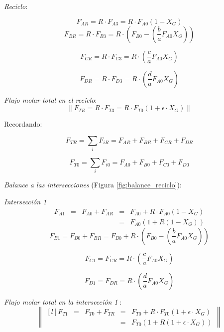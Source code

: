     \textit{Reciclo}:
    
    \begin{equation}
    \label{eq:flujo_en_reciclo_a}
        F_{AR} = R \cdot F_{A3} = R \cdot F_{A0} \left ( 1 - X_{G} \right )
    \end{equation}
    \[F_{BR} = R \cdot F_{B3} = R \cdot \left ( F_{B0} - \left (\frac{b}{a} F_{A0} X_{G} \right ) \right )\]
    
    \begin{multicols}{2}
        \[F_{CR} = R \cdot F_{C3} = R \cdot \left (\frac{c}{a} F_{A0}X_{G} \right )\]
        
        \[F_{DR} = R \cdot F_{D3} = R \cdot \left (\frac{d}{a} F_{A0}X_{G} \right )\]
    \end{multicols}
    
    \textit{Flujo molar total en el reciclo}:
    \[\left \| F_{TR} = R \cdot F_{T3} = R \cdot F_{T0} \left ( 1 + \epsilon \cdot X_{G} \right ) \right \|\]
    
    Recordando:
    \begin{multicols}{2}
        \[F_{TR} = \sum_{i} F_{iR} = F_{AR} + F_{BR} + F_{CR} + F_{DR}\]
        
        \[F_{T0} = \sum_{i} F_{i0} = F_{A0} + F_{B0} + F_{C0} + F_{D0}\]
        
    \end{multicols}
    
    \textit{Balance a las intersecciones} (Figura \ref{fig:balance_reciclo}):
    
    \textit{Intersección \textcircled{1}}
    \[
    \begin{matrix}
        F_{A1} & = & F_{A0} + F_{AR} & = & F_{A0} + R \cdot F_{A0} \left ( 1 - X_{G} \right ) \\
         & & & = & F_{A0} \left ( 1 + R \left ( 1 - X_{G} \right ) \right )
    \end{matrix}
    \]
    \[F_{B1} = F_{B0} + F_{BR} = F_{B0} + R \cdot \left ( F_{B0} - \left (\frac{b}{a} F_{A0} X_{G} \right ) \right )\]
    
    \begin{multicols}{2}    
        \[F_{C1} = F_{CR} = R \cdot \left (\frac{c}{a} F_{A0}X_{G} \right )\]
        
        \[F_{D1} = F_{DR} = R \cdot \left (\frac{d}{a} F_{A0}X_{G} \right )\]
    \end{multicols}
    
    \textit{Flujo molar total en la intersección \textcircled{1}}:
    \[\left \| 
    \begin{matrix*}[l]
        F_{T1} & = & F_{T0} + F_{TR} & = & F_{T0} + R \cdot F_{T0} \left ( 1 + \epsilon \cdot X_{G} \right ) \\
         & & & = & F_{T0} \left ( 1 + R \left ( 1 + \epsilon \cdot X_{G} \right ) \right )
    \end{matrix*}
    \right \|\]
    
